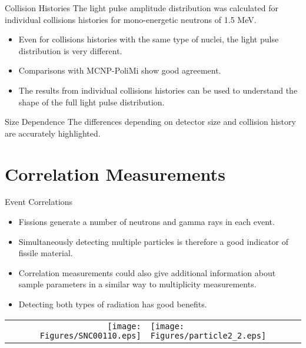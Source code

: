 \documentclass[clock,style=horatio,paper=screen,blackslide,trans=Wipe,mode=present]{powerdot}
\begin{document}
\begin{wideslide}{Collision Histories}
The light pulse amplitude distribution was calculated for
individual collisions histories for mono-energetic neutrons of 1.5
MeV.

{\vspace{5mm}\begin{itemize}
\item Even  for collisions histories with the same type of nuclei,
    the light pulse distribution is very different. \\[1mm]
\item Comparisons with MCNP-PoliMi show good agreement. \\[1mm]
\item The results from individual collisions histories can be used
    to understand the shape of the full light pulse distribution.
\end{itemize}}
\end{wideslide}


\begin{slide}{Size Dependence}
The differences depending on detector size and collision history
are accurately highlighted.
\begin{figure}[hbt]
\centering
{}
\end{figure}
\end{slide}


\section[slide=false]{Correlation Measurements}

\begin{slide}{Event Correlations}

\begin{itemize}
    \item Fissions generate a number of neutrons and gamma
        rays in each event.
    \item Simultaneously detecting multiple particles is
        therefore a good indicator of fissile material.
    \item Correlation measurements could also give additional
        information about sample parameters in a similar way
        to multiplicity measurements.
    \item Detecting both types of radiation has good benefits.
\end{itemize}
\centering
\begin{tabular}{r l}
\texttt{[image: Figures/SNC00110.eps]}   &
\texttt{[image: Figures/particle2\_2.eps]}
\end{tabular}
\end{slide}
\end{document}
